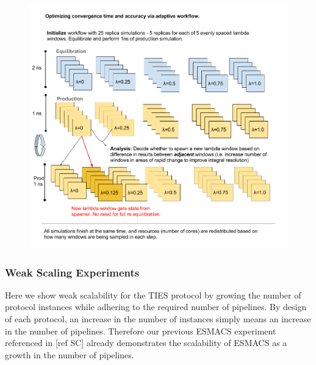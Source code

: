 \begin{figure}
  \centering
   \includegraphics[width=\columnwidth]{figures/Adaptive_TIES.png}
  \caption{}
\label{fig:adaptive_TIES}
\end{figure}

\subsubsection{Weak Scaling Experiments}

 

Here we show weak scalability for the TIES protocol by growing the number of
protocol instances while adhering to the required number of pipelines. By
design of each protocol, an increase in the number of instances simply means
an increase in the number of pipelines. Therefore our previous ESMACS
experiment referenced in [ref SC] already demonstrates the scalability of
ESMACS as a growth in the number of pipelines.

